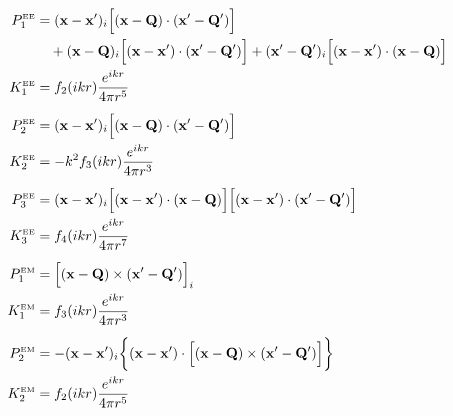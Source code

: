 \documentclass[letterpaper]{article}
\begin{document}
\begin{align*}
P^{\hbox{\tiny{EE}}}_1 
 &= (\mathbf{x} - \mathbf{x}^\prime)_i 
    \Big[ (\mathbf{x}-\mathbf{Q}) \cdot (\mathbf{x}^\prime-\mathbf{Q}^\prime)\Big] 
\\
 &\quad + (\mathbf{x}-\mathbf{Q})_i 
          \Big[ (\mathbf{x} - \mathbf{x}^\prime) \cdot (\mathbf{x}^\prime-\mathbf{Q}^\prime) \Big]
        + (\mathbf{x}^\prime-\mathbf{Q}^\prime)_i 
          \Big[ (\mathbf{x} - \mathbf{x}^\prime) \cdot (\mathbf{x}-\mathbf{Q}) \Big]
\\
K^{\hbox{\tiny{EE}}}_1 
&= f_2(ikr)\frac{e^{ikr}}{4\pi r^5}
\\[5pt]
P^{\hbox{\tiny{EE}}}_2 
&=(\mathbf{x} - \mathbf{x}^\prime)_i 
   \Big[(\mathbf{x}-\mathbf{Q}) \cdot (\mathbf{x}^\prime-\mathbf{Q}^\prime)\Big]
\\
K^{\hbox{\tiny{EE}}}_2 
&= -k^2 f_3(ikr)\frac{e^{ikr}}{4\pi r^3}
\\[5pt]
P^{\hbox{\tiny{EE}}}_3 
&=(\mathbf{x} - \mathbf{x}^\prime)_i 
   \Big[ (\mathbf{x}-\mathbf{x}^\prime) \cdot (\mathbf{x}-\mathbf{Q})  \Big]
   \Big[ (\mathbf{x}-\mathbf{x}^\prime) \cdot (\mathbf{x}^\prime-\mathbf{Q}^\prime)  \Big]
\\
K^{\hbox{\tiny{EE}}}_3 
&= f_4(ikr)\frac{e^{ikr}}{4\pi r^7}
\\[5pt]
P^{\hbox{\tiny{EM}}}_1 
&=\Big[(\mathbf{x}-\mathbf{Q}) \times (\mathbf{x}^\prime - \mathbf{Q}^\prime)\Big]_i
\\
K^{\hbox{\tiny{EM}}}_1 
&= f_3(ikr)\frac{e^{ikr}}{4\pi r^3}
\\[5pt]
P^{\hbox{\tiny{EM}}}_2 
 &= -(\mathbf{x} - \mathbf{x}^\prime)_i
     \bigg\{ (\mathbf{x} - \mathbf{x}^\prime) \cdot 
     \Big[ (\mathbf{x}-\mathbf{Q})\times (\mathbf{x}^\prime-\mathbf{Q}^\prime) \Big]\bigg\}
\\
K^{\hbox{\tiny{EM}}}_2
&= 
f_2(ikr) \frac{e^{ikr}}{4\pi r^5}
\end{align*}

\newpage


\end{document}

